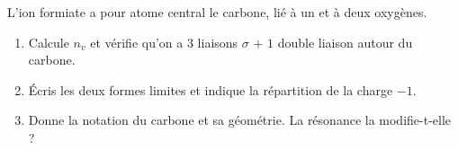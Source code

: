 \documentclass[11pt,a4paper]{article}
\begin{document}
\begin{exo}
L'ion formiate a pour atome central le carbone, lié à un  et à deux oxygènes.
\begin{enumerate}[label=\alph*)]
  \item Calcule $n_v$ et vérifie qu'on a $3$ liaisons $\sigma$ $+$ $1$ double liaison autour du carbone.
  \item Écris les deux formes limites et indique la répartition de la charge $-1$.
  \item Donne la notation  du carbone et sa géométrie. La résonance la modifie-t-elle ?
\end{enumerate}
\end{exo}
\end{document}
